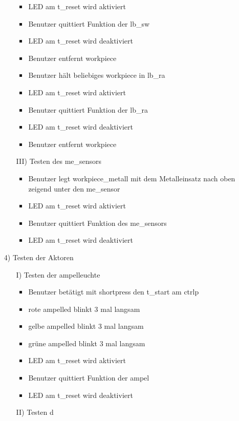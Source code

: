 \begin{enumerate}
\begin{enumerate}
\begin{itemize}
            \item LED am \gls{t_reset} wird aktiviert
            \item Benutzer quittiert Funktion der \gls{lb_sw}
            \item LED am \gls{t_reset} wird deaktiviert
            \item Benutzer entfernt \gls{workpiece}
            \item Benutzer hält beliebiges \gls{workpiece} in \gls{lb_ra}
            \item LED am \gls{t_reset} wird aktiviert
            \item Benutzer quittiert Funktion der \gls{lb_ra}
            \item LED am \gls{t_reset} wird deaktiviert
            \item Benutzer entfernt \gls{workpiece}
        \end{itemize}
        \item[III)] Testen des \gls{me_sensor}s
        \begin{itemize}
            \item Benutzer legt \gls{workpiece_metall} mit dem Metalleinsatz nach oben zeigend unter den \gls{me_sensor}
            \item LED am \gls{t_reset} wird aktiviert
            \item Benutzer quittiert Funktion des \gls{me_sensor}s
            \item LED am \gls{t_reset} wird deaktiviert
        \end{itemize}
    \end{enumerate}
    \item[4)] Testen der Aktoren
    \begin{enumerate}
        \item[I)] Testen der \gls{ampelleuchte}
        \begin{itemize}
            \item Benutzer betätigt mit \gls{shortpress} den \gls{t_start} am \gls{ctrlp}
            \item rote \gls{ampelled} blinkt 3 mal langsam
            \item gelbe \gls{ampelled} blinkt 3 mal langsam
            \item grüne \gls{ampelled} blinkt 3 mal langsam
            \item LED am \gls{t_reset} wird aktiviert
            \item Benutzer quittiert Funktion der \gls{ampel}
            \item LED am \gls{t_reset} wird deaktiviert
        \end{itemize}
        \item[II)] Testen d
    \end{enumerate}


\end{enumerate}
